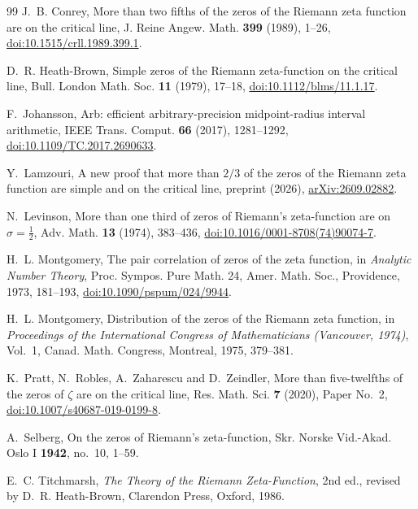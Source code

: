 \documentclass[aps,prd,twocolumn,superscriptaddress,nofootinbib,longbibliography,floatfix,showkeys,amsmath,amssymb,10pt]{revtex4-2}
\theoremstyle{definition}
\theoremstyle{remark}
\begin{document}
\begin{thebibliography}{99}
J.~B. Conrey, More than two fifths of the zeros of the Riemann zeta function
are on the critical line, J. Reine Angew. Math. \textbf{399} (1989), 1--26,
\href{https://doi.org/10.1515/crll.1989.399.1}{doi:10.1515/crll.1989.399.1}.

D.~R. Heath-Brown, Simple zeros of the Riemann zeta-function on the
critical line, Bull. London Math. Soc. \textbf{11} (1979), 17--18,
\href{https://doi.org/10.1112/blms/11.1.17}{doi:10.1112/blms/11.1.17}.

F.~Johansson, Arb: efficient arbitrary-precision midpoint-radius interval
arithmetic, IEEE Trans. Comput. \textbf{66} (2017), 1281--1292,
\href{https://doi.org/10.1109/TC.2017.2690633}{doi:10.1109/TC.2017.2690633}.

Y.~Lamzouri, A new proof that more than $2/3$ of the zeros of the Riemann
zeta function are simple and on the critical line, preprint (2026),
\href{https://arxiv.org/abs/2609.02882}{arXiv:2609.02882}.

N.~Levinson, More than one third of zeros of Riemann's zeta-function are on
$\sigma=\frac12$, Adv. Math. \textbf{13} (1974), 383--436,
\href{https://doi.org/10.1016/0001-8708(74)90074-7}{doi:10.1016/0001-8708(74)90074-7}.

H.~L. Montgomery, The pair correlation of zeros of the zeta function, in
\emph{Analytic Number Theory}, Proc. Sympos. Pure Math. 24, Amer. Math.
Soc., Providence, 1973, 181--193,
\href{https://doi.org/10.1090/pspum/024/9944}{doi:10.1090/pspum/024/9944}.

H.~L. Montgomery, Distribution of the zeros of the Riemann zeta function,
in \emph{Proceedings of the International Congress of Mathematicians
(Vancouver, 1974)}, Vol.~1, Canad. Math. Congress, Montreal, 1975, 379--381.

K.~Pratt, N.~Robles, A.~Zaharescu and D.~Zeindler, More than five-twelfths
of the zeros of $\zeta$ are on the critical line, Res. Math. Sci.
\textbf{7} (2020), Paper No.~2,
\href{https://doi.org/10.1007/s40687-019-0199-8}{doi:10.1007/s40687-019-0199-8}.

A.~Selberg, On the zeros of Riemann's zeta-function, Skr. Norske
Vid.-Akad. Oslo I \textbf{1942}, no.~10, 1--59.

E.~C. Titchmarsh, \emph{The Theory of the Riemann Zeta-Function}, 2nd ed.,
revised by D.~R. Heath-Brown, Clarendon Press, Oxford, 1986.


\end{thebibliography}
\end{document}
